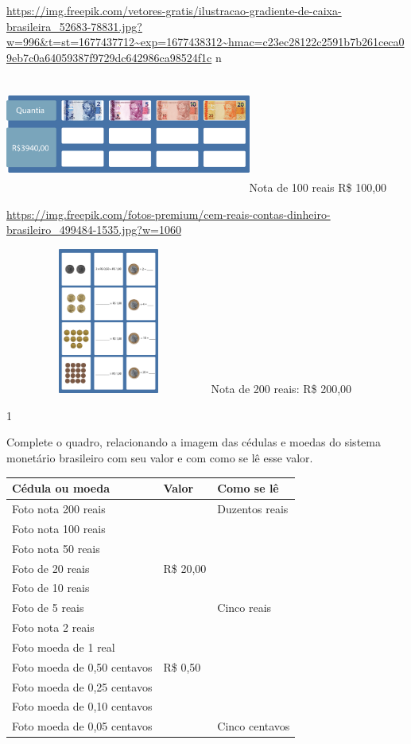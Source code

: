 \begin{multicols}{2}
{\url{https://img.freepik.com/vetores-gratis/ilustracao-gradiente-de-caixa-brasileira_52683-78831.jpg?w=996\&t=st=1677437712~exp=1677438312~hmac=c23ec28122c2591b7b261ceca09eb7c0a64059387f9729dc642986ca98524f1c}
n

\includegraphics[width=3.18285in,height=1.50833in]{media/image70.png}Nota
de 100 reais R\$ 100,00

\url{https://img.freepik.com/fotos-premium/cem-reais-contas-dinheiro-brasileiro_499484-1535.jpg?w=1060}

\includegraphics[width=2.68333in,height=1.88913in]{media/image71.png}Nota
de 200 reais: R\$ 200,00


\num{1}

Complete o quadro, relacionando a imagem das cédulas e moedas do
sistema monetário brasileiro com seu valor e com como se lê esse valor.


\begin{longtable}[]{@{}lll@{}}
\toprule
Cédula ou moeda & Valor & Como se lê\tabularnewline
\midrule
\endhead
Foto nota 200 reais & & Duzentos reais\tabularnewline
Foto nota 100 reais & &\tabularnewline
Foto nota 50 reais & &\tabularnewline
Foto de 20 reais & R\$ 20,00 &\tabularnewline
Foto de 10 reais & &\tabularnewline
Foto de 5 reais & & Cinco reais\tabularnewline
Foto nota 2 reais & &\tabularnewline
Foto moeda de 1 real & &\tabularnewline
Foto moeda de 0,50 centavos & R\$ 0,50 &\tabularnewline
Foto moeda de 0,25 centavos & &\tabularnewline
Foto moeda de 0,10 centavos & &\tabularnewline
Foto moeda de 0,05 centavos & & Cinco centavos\tabularnewline
\bottomrule
\end{longtable}

}
\end{multicols}
